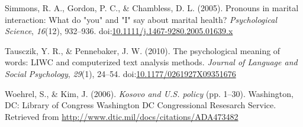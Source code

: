 \documentclass[
  english,
  ,man,floatsintext]{apa6}
\begin{document}
\leavevmode\hypertarget{ref-Simmons2005}{}%
Simmons, R. A., Gordon, P. C., \& Chambless, D. L. (2005). Pronouns in marital interaction: What do "you" and "I" say about marital health? \emph{Psychological Science}, \emph{16}(12), 932--936. doi:\href{https://doi.org/10.1111/j.1467-9280.2005.01639.x}{10.1111/j.1467-9280.2005.01639.x}

\leavevmode\hypertarget{ref-Tausczik2010}{}%
Tausczik, Y. R., \& Pennebaker, J. W. (2010). The psychological meaning of words: LIWC and computerized text analysis methods. \emph{Journal of Language and Social Psychology}, \emph{29}(1), 24--54. doi:\href{https://doi.org/10.1177/0261927X09351676}{10.1177/0261927X09351676}

\leavevmode\hypertarget{ref-Woehrel2006}{}%
Woehrel, S., \& Kim, J. (2006). \emph{Kosovo and U.S. policy} (pp. 1--30). Washington, DC: Library of Congress Washington DC Congressional Resesarch Service. Retrieved from \url{http://www.dtic.mil/docs/citations/ADA473482}
\end{document}
